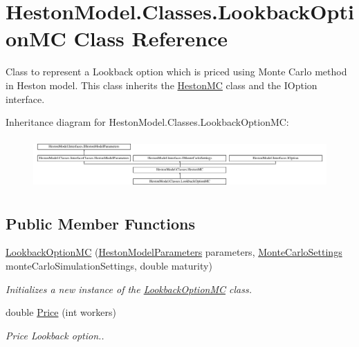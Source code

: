 \hypertarget{class_heston_model_1_1_classes_1_1_lookback_option_m_c}{}\section{Heston\+Model.\+Classes.\+Lookback\+Option\+MC Class Reference}
\label{class_heston_model_1_1_classes_1_1_lookback_option_m_c}


Class to represent a Lookback option which is priced using Monte Carlo method in Heston model. This class inherits the \mbox{\hyperlink{class_heston_model_1_1_classes_1_1_heston_m_c}{Heston\+MC}} class and the I\+Option interface.  


Inheritance diagram for Heston\+Model.\+Classes.\+Lookback\+Option\+MC\+:\begin{figure}[H]
\begin{center}
\leavevmode
\includegraphics[height=1.954625cm]{class_heston_model_1_1_classes_1_1_lookback_option_m_c}
\end{center}
\end{figure}
\subsection*{Public Member Functions}
\begin{DoxyCompactItemize}
\item 
\mbox{\hyperlink{class_heston_model_1_1_classes_1_1_lookback_option_m_c_ab441b9a54c2eba0a01e3987cc6c9c489}{Lookback\+Option\+MC}} (\mbox{\hyperlink{class_heston_model_1_1_classes_1_1_interface_classes_1_1_heston_model_parameters}{Heston\+Model\+Parameters}} parameters, \mbox{\hyperlink{class_heston_model_1_1_classes_1_1_interface_classes_1_1_monte_carlo_settings}{Monte\+Carlo\+Settings}} monte\+Carlo\+Simulation\+Settings, double maturity)
\begin{DoxyCompactList}\small\item\em Initializes a new instance of the \mbox{\hyperlink{class_heston_model_1_1_classes_1_1_lookback_option_m_c}{Lookback\+Option\+MC}} class. \end{DoxyCompactList}\item 
double \mbox{\hyperlink{class_heston_model_1_1_classes_1_1_lookback_option_m_c_ae0723eb82160e699ca2ac7078c222485}{Price}} (int workers)
\begin{DoxyCompactList}\small\item\em Price Lookback option.. \end{DoxyCompactList}\end{DoxyCompactItemize}
